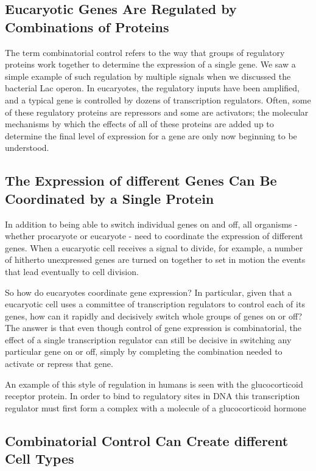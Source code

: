 \subsection{Eucaryotic Genes Are Regulated by Combinations of Proteins}

The term combinatorial control refers to the way that groups of regulatory
proteins work together to determine the expression of a single gene.
We saw a simple example of such regulation by multiple signals when
we discussed the bacterial Lac operon. In eucaryotes, the
regulatory inputs have been amplified, and a typical gene is controlled
by dozens of transcription regulators. Often, some of these
regulatory proteins are repressors and some are activators; the molecular
mechanisms by which the effects of all of these proteins are added up to
determine the final level of expression for a gene are only now beginning
to be understood.

\subsection{The Expression of different Genes Can Be Coordinated by a Single Protein}

In addition to being able to switch individual genes on and off, all
organisms - whether procaryote or eucaryote - need to coordinate the
expression of different genes. When a eucaryotic cell receives a signal to
divide, for example, a number of hitherto unexpressed genes are turned
on together to set in motion the events that lead eventually to cell division.

So how do eucaryotes coordinate gene expression? In particular, given that a eucaryotic
cell uses a committee of transcription regulators to control each of its genes,
how can it rapidly and decisively
switch whole groups of genes on or off? The answer is that even though
control of gene expression is combinatorial, the effect of a single transcription
regulator can still be decisive in switching any particular gene
on or off, simply by completing the combination needed to activate or
repress that gene.

An example of this style of regulation in humans is seen with the glucocorticoid
receptor protein. In order to bind to regulatory sites in DNA
this transcription regulator must first form a complex with a molecule
of a glucocorticoid hormone

\subsection{Combinatorial Control Can Create different Cell Types}

